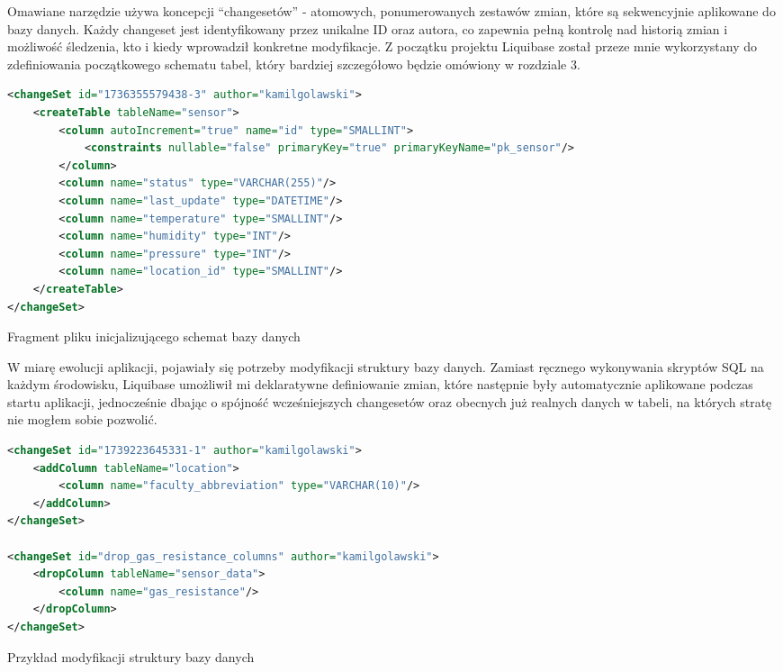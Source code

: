 \documentclass[a4paper,12pt,openany]{book}
\begin{document}
Omawiane narzędzie używa koncepcji ``changesetów'' - atomowych, ponumerowanych zestawów zmian, które są sekwencyjnie aplikowane do bazy danych. Każdy changeset jest identyfikowany przez unikalne ID oraz autora, co zapewnia pełną kontrolę nad historią zmian i możliwość śledzenia, kto i kiedy wprowadził konkretne modyfikacje. Z początku projektu Liquibase został przeze mnie wykorzystany do zdefiniowania początkowego schematu tabel, który bardziej szczegółowo będzie omówiony w rozdziale 3.

\begin{lstfloat}[htbp]
\begin{lstlisting}[language=xml]
<changeSet id="1736355579438-3" author="kamilgolawski">
    <createTable tableName="sensor">
        <column autoIncrement="true" name="id" type="SMALLINT">
            <constraints nullable="false" primaryKey="true" primaryKeyName="pk_sensor"/>
        </column>
        <column name="status" type="VARCHAR(255)"/>
        <column name="last_update" type="DATETIME"/>
        <column name="temperature" type="SMALLINT"/>
        <column name="humidity" type="INT"/>
        <column name="pressure" type="INT"/>
        <column name="location_id" type="SMALLINT"/>
    </createTable>
</changeSet>
\end{lstlisting}
\caption{Fragment pliku inicjalizującego schemat bazy danych}
\label{lst:liquibase-init}
\end{lstfloat}

W miarę ewolucji aplikacji, pojawiały się potrzeby modyfikacji struktury bazy danych. Zamiast ręcznego wykonywania skryptów SQL na każdym środowisku, Liquibase umożliwił mi deklaratywne definiowanie zmian, które następnie były automatycznie aplikowane podczas startu aplikacji, jednocześnie dbając o spójność wcześniejszych changesetów oraz obecnych już realnych danych w tabeli, na których stratę nie mogłem sobie pozwolić.

\begin{lstfloat}[htbp]
\begin{lstlisting}[language=xml]
<changeSet id="1739223645331-1" author="kamilgolawski">
    <addColumn tableName="location">
        <column name="faculty_abbreviation" type="VARCHAR(10)"/>
    </addColumn>
</changeSet>

<changeSet id="drop_gas_resistance_columns" author="kamilgolawski">
    <dropColumn tableName="sensor_data">
        <column name="gas_resistance"/>
    </dropColumn>
</changeSet>
\end{lstlisting}
\caption{Przykład modyfikacji struktury bazy danych}
\label{lst:liquibase-modify}
\end{lstfloat}
\end{document}
